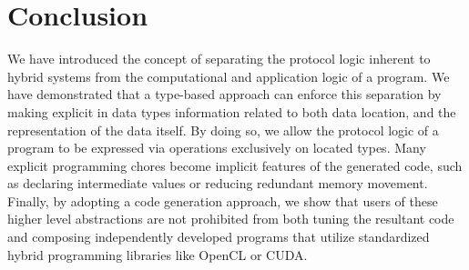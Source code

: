 
\section{Conclusion}
\label{sec:conclusion}

We have introduced the concept of separating the protocol logic
inherent to hybrid systems from the computational and application
logic of a program. We have demonstrated that a type-based
approach can enforce this separation by making explicit in data
types information related to both data location, and the
representation of the data itself. By doing so, we allow the
protocol logic of a program to be expressed via operations
exclusively on located types. Many explicit programming chores
become implicit features of the generated code, such as declaring
intermediate values or reducing redundant memory movement.
Finally, by adopting a code generation approach, we show that
users of these higher level abstractions are not prohibited from
both tuning the resultant code and composing independently
developed programs that utilize standardized hybrid programming
libraries like OpenCL or CUDA.

